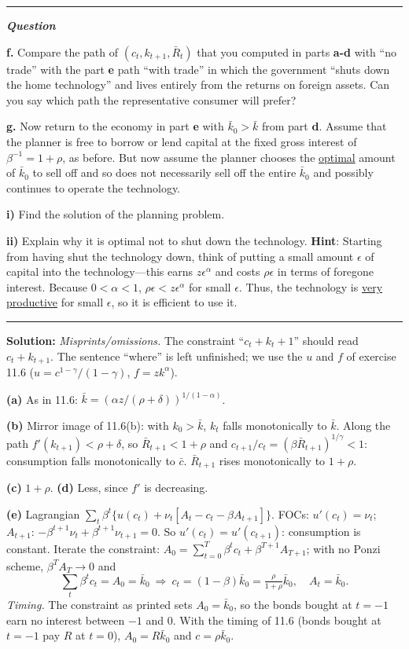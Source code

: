 \documentclass[12pt, letterpaper]{article}
\newenvironment{longquestion}{\par\small\noindent\textcolor{gray!60}{\rule{\linewidth}{0.4pt}}\par\nobreak
  \noindent\textcolor{gray!60!black}{\bfseries\textit{Question}}\par\nobreak}{\par\noindent
  \textcolor{gray!60}{\rule{\linewidth}{0.4pt}}\par}
\newcommand{\Rb}{\bar R}
\newcommand{\kb}{\bar k}
\newcommand{\cb}{\bar c}
\begin{document}
\begin{tcolorbox}[evenbox,title={Exercise 11.8 \quad Trade and growth, version II}]
\begin{longquestion}
\textbf{f.} Compare the path of $(c_t,k_{t+1},\bar R_t)$ that you computed in parts \textbf{a-d} with ``no trade'' with
the part \textbf{e} path ``with trade'' in which the government ``shuts down the home technology'' and lives entirely
from the returns on foreign assets. Can you say which path the representative consumer will prefer?

\textbf{g.} Now return to the economy in part \textbf{e} with $\bar k_0>\bar k$ from part \textbf{d}. Assume that the
planner is free to borrow or lend capital at the fixed gross interest of $\beta^{-1}=1+\rho$, as before. But now assume
the planner chooses the \underline{optimal} amount of $\bar k_0$ to sell off and so does not necessarily sell off the
entire $\bar k_0$ and possibly continues to operate the technology.

\quad\textbf{i)} Find the solution of the planning problem.

\quad\textbf{ii)} Explain why it is optimal not to shut down the technology. \textbf{Hint}: Starting from having shut
the technology down, think of putting a small amount $\epsilon$ of capital into the technology---this earns
$z\epsilon^\alpha$ and costs $\rho\epsilon$ in terms of foregone interest. Because $0<\alpha<1$, $\rho\epsilon<z\epsilon^\alpha$
for small $\epsilon$. Thus, the technology is \underline{very productive} for small $\epsilon$, so it is efficient to use
it.
\end{longquestion}

\textbf{Solution:} \emph{Misprints/omissions.} The constraint ``$c_t+k_t+1$'' should read $c_t+k_{t+1}$. The sentence
``where'' is left unfinished; we use the $u$ and $f$ of exercise 11.6 ($u=c^{1-\gamma}/(1-\gamma)$, $f=zk^\alpha$).

\textbf{(a)} As in 11.6: $\kb=(\alpha z/(\rho+\delta))^{1/(1-\alpha)}$.

\textbf{(b)} Mirror image of 11.6(b): with $k_0>\kb$, $k_t$ falls monotonically to $\kb$. Along the path
$f'(k_{t+1})<\rho+\delta$, so $\Rb_{t+1}<1+\rho$ and $c_{t+1}/c_t=(\beta\Rb_{t+1})^{1/\gamma}<1$: consumption falls
monotonically to $\cb$. $\Rb_{t+1}$ rises monotonically to $1+\rho$.

\textbf{(c)} $1+\rho$. \textbf{(d)} Less, since $f'$ is decreasing.

\textbf{(e)} Lagrangian $\sum_t\beta^t\{u(c_t)+\nu_t[A_t-c_t-\beta A_{t+1}]\}$. FOCs: $u'(c_t)=\nu_t$;
$A_{t+1}$: $-\beta^{t+1}\nu_t+\beta^{t+1}\nu_{t+1}=0$. So $u'(c_t)=u'(c_{t+1})$: consumption is constant. Iterate the
constraint: $A_0=\sum_{t=0}^{T}\beta^tc_t+\beta^{T+1}A_{T+1}$; with no Ponzi scheme, $\beta^TA_T\to0$ and
\[
\sum_t\beta^tc_t=A_0=\kb_0\ \Rightarrow\ \boxed{c_t=(1-\beta)\kb_0=\tfrac{\rho}{1+\rho}\kb_0,\quad A_t=\kb_0 .}
\]
\emph{Timing.} The constraint as printed sets $A_0=\kb_0$, so the bonds bought at $t=-1$ earn no interest between $-1$ and
0. With the timing of 11.6 (bonds bought at $t=-1$ pay $R$ at $t=0$), $A_0=R\kb_0$ and $c=\rho\kb_0$.


\end{tcolorbox}
\end{document}
